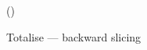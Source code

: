 \begin{figure}[H]
\flushleft {}
\begin{smathpar}
{
   \totalisebwd{\sigma}
               {() \concat \vec{\pi}}
               {\elimCons{\tau}}
               {\alpha \join \beta}
}
\end{smathpar}
\caption{Totalise --- backward slicing}
\end{figure}
